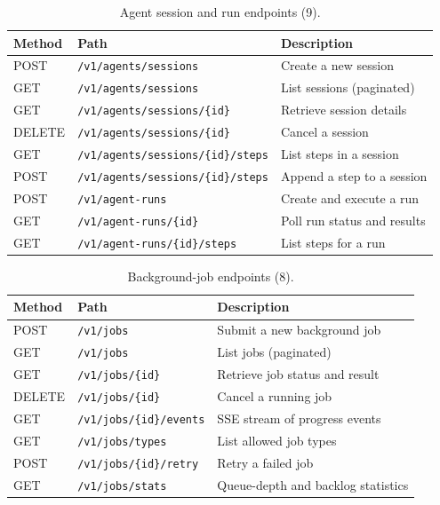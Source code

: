 \documentclass[a4paper]{sapthesis}
\begin{document}
\begin{table}[ht]
\centering
\caption{Agent session and run endpoints (9).}
\label{tab:app-agent-ep}
\small
\begin{tabularx}{\textwidth}{@{}l l X@{}}
    \hline
    \textbf{Method} & \textbf{Path} & \textbf{Description} \\
    \hline
    POST   & \texttt{/v1/agents/sessions}               & Create a new session \\
    GET    & \texttt{/v1/agents/sessions}               & List sessions (paginated) \\
    GET    & \texttt{/v1/agents/sessions/\{id\}}        & Retrieve session details \\
    DELETE & \texttt{/v1/agents/sessions/\{id\}}        & Cancel a session \\
    GET    & \texttt{/v1/agents/sessions/\{id\}/steps}  & List steps in a session \\
    POST   & \texttt{/v1/agents/sessions/\{id\}/steps}  & Append a step to a session \\
    POST   & \texttt{/v1/agent-runs}                    & Create and execute a run \\
    GET    & \texttt{/v1/agent-runs/\{id\}}             & Poll run status and results \\
    GET    & \texttt{/v1/agent-runs/\{id\}/steps}       & List steps for a run \\
    \hline
\end{tabularx}
\end{table}

\begin{table}[ht]
\centering
\caption{Background-job endpoints (8).}
\label{tab:app-job-ep}
\small
\begin{tabularx}{\textwidth}{@{}l l X@{}}
    \hline
    \textbf{Method} & \textbf{Path} & \textbf{Description} \\
    \hline
    POST   & \texttt{/v1/jobs}               & Submit a new background job \\
    GET    & \texttt{/v1/jobs}               & List jobs (paginated) \\
    GET    & \texttt{/v1/jobs/\{id\}}        & Retrieve job status and result \\
    DELETE & \texttt{/v1/jobs/\{id\}}        & Cancel a running job \\
    GET    & \texttt{/v1/jobs/\{id\}/events} & SSE stream of progress events \\
    GET    & \texttt{/v1/jobs/types}          & List allowed job types \\
    POST   & \texttt{/v1/jobs/\{id\}/retry}  & Retry a failed job \\
    GET    & \texttt{/v1/jobs/stats}          & Queue-depth and backlog statistics \\
    \hline
\end{tabularx}
\end{table}
\end{document}

